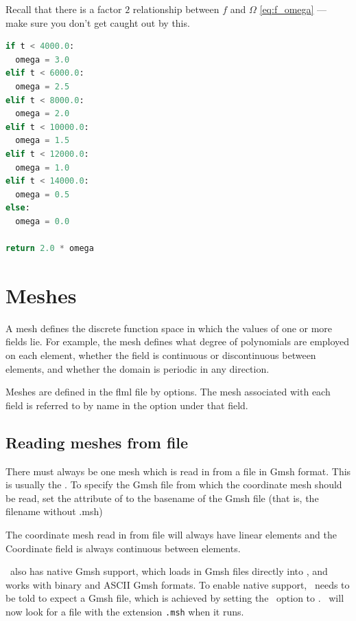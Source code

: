 Recall that there is a factor $2$ relationship between $f$ and $\Omega$
\eqref{eq:f_omega} --- make sure you don't get caught out by this.

\begin{example}
\begin{lstlisting}[language = Python]
if t < 4000.0:
  omega = 3.0
elif t < 6000.0:
  omega = 2.5
elif t < 8000.0:
  omega = 2.0
elif t < 10000.0:
  omega = 1.5
elif t < 12000.0:
  omega = 1.0
elif t < 14000.0:
  omega = 0.5
else:
  omega = 0.0

return 2.0 * omega
\end{lstlisting}
\caption{ definition, sweeping through a number of
         rotation rates. Note the factor of $2$ between $f$ and $\Omega$ (see
         equation \eqref{eq:f_omega}).}
\label{ex:python_f_plane}
\end{example}


\section{Meshes}\label{sec:Mesh}

A mesh defines the discrete
function space in which the values of one or more fields lie. For example, the mesh
defines what degree of polynomials are employed on each element, whether the
field is continuous or discontinuous between elements, and whether the
domain is periodic in any direction.

Meshes are defined in the flml file by  options. The
mesh associated with each field is referred to by name in the
 option under that field.

\subsection{Reading meshes from file}
There must always be one mesh which is read in from a file in
Gmsh format. This is usually the . To specify the
Gmsh file from which the coordinate mesh should be read, set the
 attribute of
 to the basename
of the Gmsh file (that is, the filename without .msh)

The coordinate mesh read in from file will always have linear elements and
the Coordinate field is always continuous between elements.

\fluidity\ also has native Gmsh support, which loads in Gmsh files directly into
\fluidity, and works with binary and ASCII Gmsh formats. To enable native
support, \fluidity\ needs to be told to expect a Gmsh file, which is achieved
by setting the \onlypdf{}\ option
to \onlypdf{}.  \fluidity\ will now look for a file with the extension
\lstinline[language=bash]+.msh+ when it runs.


